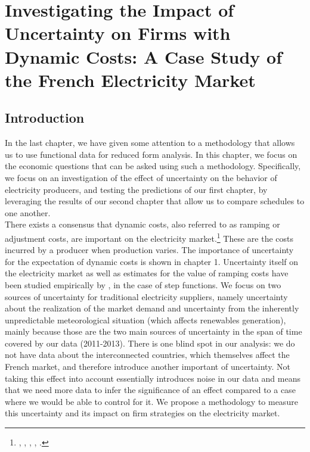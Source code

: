 

\renewcommand{\thesection}{\arabic{chapter}.\arabic{section}}


\chapter{Investigating the Impact of Uncertainty on Firms with Dynamic Costs: A Case Study of the French Electricity Market}
\label{chap:ch2}
\cleardoublepage

\doublespacing
\section{Introduction}
In the last chapter, we have given some attention to a methodology that allows us to use functional data for reduced form analysis. In this chapter, we focus on the economic questions that can be asked using such a methodology. Specifically, we focus on an investigation of the effect of uncertainty on the behavior of electricity producers, and testing the predictions of our first chapter, by leveraging the results of our second chapter that allow us to compare schedules to one another. \\

There exists a consensus that dynamic costs, also referred to as ramping or adjustment costs, are important on the electricity market.\footnote{ \cite{anderson2005supply},  \cite{hobbs2001next}, \cite{hortacsu2008understanding}, \cite{reguant2011welfare}, \cite{sewalt2003negative}. } These are the costs incurred by a producer when production varies. 
The importance of uncertainty for the expectation of dynamic costs is shown in chapter 1. Uncertainty itself on the electricity market as well as estimates for the value of ramping costs have been studied empirically by \cite{wolak2007quantifying}, in the case of step functions. We focus on two sources of uncertainty for traditional electricity suppliers, namely uncertainty about the realization of the market demand and uncertainty from the inherently unpredictable meteorological situation
(which affects renewables generation), mainly because those are the two main sources of uncertainty in the span of time covered by our data (2011-2013). There is one blind spot in our analysis: we do not have data about the interconnected countries, which themselves affect the French market, and therefore introduce another important of uncertainty. Not taking this effect into account essentially introduces noise in our data and means that we need more data to infer the significance of an effect compared to a case where we would be able to control for it. We propose a methodology to measure this uncertainty and its impact on firm strategies on the electricity market. \\

